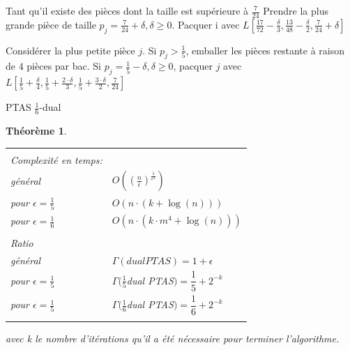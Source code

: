 \documentclass[a4paper,12pt]{report}
\theoremstyle{plain}				%
\newtheorem{theoreme}{Théorème}	%
\theoremstyle{definition}				%
\begin{document}
\begin{algorithm}[H]
Tant qu'il existe des pièces dont la taille est supérieure à $\frac{7}{24}$
Prendre la plus grande pièce de taille $p_j = \frac{7}{24}+\delta, \delta \geq 0$.
Pacquer i avec
$L[\frac{17}{72}-\frac{\delta}{3},
   \frac{13}{48}-\frac{\delta}{2},
   \frac{7}{24}+\delta]$

Considérer la plus petite pièce $j$.
Si $p_j>\frac{1}{5}$, emballer les pièces restante à raison de $4$ pièces par bac.
Si $p_j=\frac{1}{5}-\delta, \delta \geq 0$, pacquer $j$ avec
$L[\frac{1}{5}+\frac{\delta}{4},
   \frac{1}{5}+\frac{2 \cdot \delta}{3},
   \frac{1}{5}+\frac{3 \cdot \delta}{2},
   \frac{7}{24}]$

\BlankLine %



\caption{PTAS $\frac{1}{6}$-dual}
\label{algo:PTASDual1_6}
\end{algorithm}

\bigskip

\begin{theoreme}
\begin{flushleft}
\begin{tabular}{|p{8cm}p{6cm}|}
\hline
& \\
Complexité en temps:& \\
général&
	$ O(( \frac{n}{\epsilon})^\frac{1}{\epsilon ^ 2})$\\
pour $ \epsilon = \frac{1}{5}$ &
	$O(n \cdot (k + \log(n)))$ \\
pour $ \epsilon = \frac{1}{6}$ &
	$O(n \cdot (k \cdot m^4 + \log(n)))$

\\	%
& \\
Ratio & \\
général &
	$\Gamma(dual PTAS) = 1 + \epsilon$\\

pour $ \epsilon = \frac{1}{5}$ &
	$\Gamma(\frac{1}{5}$dual PTAS$) = \dfrac{1}{5} + 2^{-k}$\\

pour $ \epsilon = \frac{1}{5}$ &
	$\Gamma(\frac{1}{6}$dual PTAS$) = \dfrac{1}{6} + 2^{-k}$
\\
& \\
\hline
\end{tabular}
\end{flushleft}
avec k le nombre d'itérations qu'il a été nécessaire pour terminer l'algorithme.
\end{theoreme}
\end{document}
